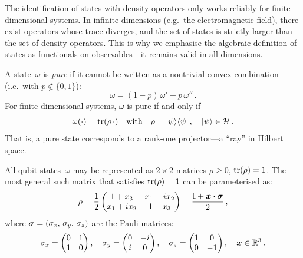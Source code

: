 \begin{remark}
  The identification of states with density operators only works
  reliably for finite-dimensional systems.  In infinite dimensions
  (e.g.\ the electromagnetic field), there exist operators whose trace
  diverges, and the set of states is strictly larger than the set of
  density operators.  This is why we emphasise the algebraic definition
  of states as functionals on observables---it remains valid in all
  dimensions.
\end{remark}

\begin{definition}\label{def:pure-state}
  A state~$\omega$ is \emph{pure} if it cannot be written as a
  nontrivial convex combination (i.e.\ with $p \notin \{0,1\}$):
  \begin{equation}\label{eq:pure-state-def}
    \omega = (1 - p)\,\omega' + p\,\omega''\,.
  \end{equation}
  For finite-dimensional systems, $\omega$ is pure if and only if
  \begin{equation}\label{eq:pure-density}
    \omega(\cdot) = \operatorname{tr}(\rho\,\cdot) \quad\text{with}\quad
    \rho = \lvert \psi \rangle\langle \psi \rvert\,,\quad
    \lvert \psi \rangle \in \mathcal{H}\,.
  \end{equation}
  That is, a pure state corresponds to a rank-one projector---a
  ``ray'' in Hilbert space.
\end{definition}

\begin{example}\label{ex:bloch}
  All qubit states~$\omega$ may be represented as $2 \times 2$
  matrices $\rho \geq 0$, $\operatorname{tr}(\rho) = 1$.  The most general such
  matrix that satisfies $\operatorname{tr}(\rho)=1$ can be parameterised as:
  \begin{equation}\label{eq:bloch-rho}
    \rho = \frac{1}{2}
    \begin{pmatrix}
      1 + x_3 & x_1 - ix_2 \\
      x_1 + ix_2 & 1 - x_3
    \end{pmatrix}
    = \frac{\mathbb{I} + \boldsymbol{x}\cdot\boldsymbol{\sigma}}{2}\,,
  \end{equation}
  where $\boldsymbol{\sigma} = (\sigma_x,\,\sigma_y,\,\sigma_z)$ are the Pauli matrices:
  \begin{equation}\label{eq:pauli}
    \sigma_x = \begin{pmatrix} 0 & 1 \\ 1 & 0 \end{pmatrix},\quad
    \sigma_y = \begin{pmatrix} 0 & -i \\ i & 0 \end{pmatrix},\quad
    \sigma_z = \begin{pmatrix} 1 & 0 \\ 0 & -1 \end{pmatrix},\quad
    \boldsymbol{x} \in \mathbb{R}^3\,.
  \end{equation}
\end{example}

